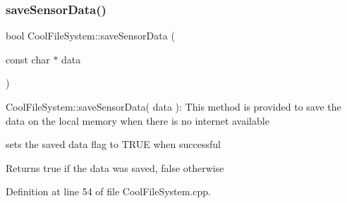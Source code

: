 \mbox{\label{class_cool_file_system_afa3a4feae94871d4d3b6bebb701c2e67}} 
\subsubsection{\texorpdfstring{save\+Sensor\+Data()}{saveSensorData()}}
{\footnotesize\ttfamily bool Cool\+File\+System\+::save\+Sensor\+Data (\begin{DoxyParamCaption}\item[{const char $\ast$}]{data }\end{DoxyParamCaption})}

Cool\+File\+System\+::save\+Sensor\+Data( data )\+: This method is provided to save the data on the local memory when there is no internet available

sets the saved data flag to T\+R\+UE when successful

\begin{DoxyReturn}{Returns}
true if the data was saved, false otherwise 
\end{DoxyReturn}


Definition at line 54 of file Cool\+File\+System.\+cpp.


